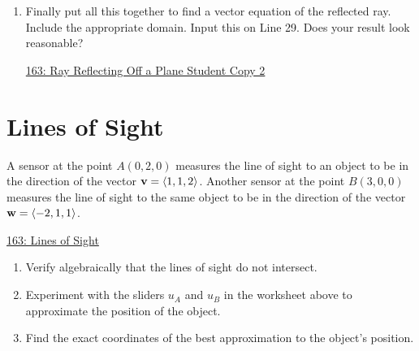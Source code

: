 \documentclass{ximera}
\begin{document}
\begin{question}
\begin{enumerate}


\item Finally put all this together to find a vector equation of the reflected ray. Include the appropriate domain. Input this on Line 29. Does your result look reasonable?


\begin{onlineOnly}
    \begin{center}
\end{center}
\end{onlineOnly}

\href{https://www.desmos.com/3d/znxtexpsnt}{163: Ray Reflecting Off a Plane Student Copy 2}




\end{enumerate}

\end{question}

\section{Lines of Sight}
A sensor at the point $A(0,2,0)$ measures the line of sight to an object to be in the direction of the vector ${\bf v} = \langle 1, 1, 2 \rangle$. Another sensor at the point $B(3,0,0)$ measures the line of sight to the same object to be in the direction of the vector ${\bf w} = \langle -2,1,1 \rangle$.

\begin{onlineOnly}
    \begin{center}
\end{center}
\end{onlineOnly}

\href{https://www.desmos.com/3d/xo9oqgelty}{163: Lines of Sight}

\begin{enumerate}
\item Verify algebraically that the lines of sight do not intersect.

\item Experiment with the sliders $u_A$ and $u_B$ in the worksheet above to approximate the position of the object.

\item Find the exact coordinates of the best approximation to the object's position.
\end{enumerate}





\end{document}
